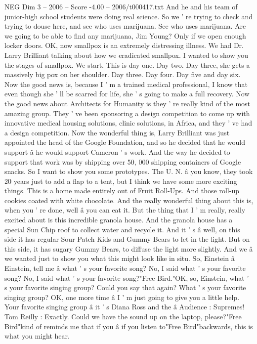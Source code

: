 \begin{textsample}{NEG Dim 3 – 2006 – Score -4.00 – 2006/t000417.txt}
And he and his team of junior-high school students were doing real science.
So we ' re trying to check and trying to douse here, and see who uses marijuana.
See who uses marijuana.
Are we going to be able to find any marijuana, Jim Young?
Only if we open enough locker doors.
OK, now smallpox is an extremely distressing illness.
We had Dr.
Larry Brilliant talking about how we eradicated smallpox.
I wanted to show you the stages of smallpox.
We start.
This is day one.
Day two.
Day three, she gets a massively big pox on her shoulder.
Day three.
Day four.
Day five and day six.
Now the good news is, because I ' m a trained medical professional, I know that even though she ' ll be scarred for life, she ' s going to make a full recovery.
Now the good news about Architects for Humanity is they ' re really kind of the most amazing group.
They ' ve been sponsoring a design competition to come up with innovative medical housing solutions, clinic solutions, in Africa, and they ' ve had a design competition.
Now the wonderful thing is, Larry Brilliant was just appointed the head of the Google Foundation, and so he decided that he would support â he would support Cameron ' s work.
And the way he decided to support that work was by shipping over 50, 000 shipping containers of Google snacks.
So I want to show you some prototypes.
The U.
N. â you know, they took 20 years just to add a flap to a tent, but I think we have some more exciting things.
This is a home made entirely out of Fruit Roll-Ups.
And those roll-up cookies coated with white chocolate.
And the really wonderful thing about this is, when you ' re done, well â you can eat it.
But the thing that I ' m really, really excited about is this incredible granola house.
And the granola house has a special Sun Chip roof to collect water and recycle it.
And it ' s â well, on this side it has regular Sour Patch Kids and Gummy Bears to let in the light.
But on this side, it has sugary Gummy Bears, to diffuse the light more slightly.
And we â we wanted just to show you what this might look like in situ.
So, Einstein â Einstein, tell me â what ' s your favorite song?
No, I said what ' s your favorite song?
No, I said what ' s your favorite song?"Free Bird."OK, so, Einstein, what ' s your favorite singing group?
Could you say that again?
What ' s your favorite singing group?
OK, one more time â I ' m just going to give you a little help.
Your favorite singing group â it ' s Diana Ross and the â Audience : Supremes!
Tom Reilly : Exactly.
Could we have the sound up on the laptop, please?"Free Bird"kind of reminds me that if you â if you listen to"Free Bird"backwards, this is what you might hear.

\end{textsample}
